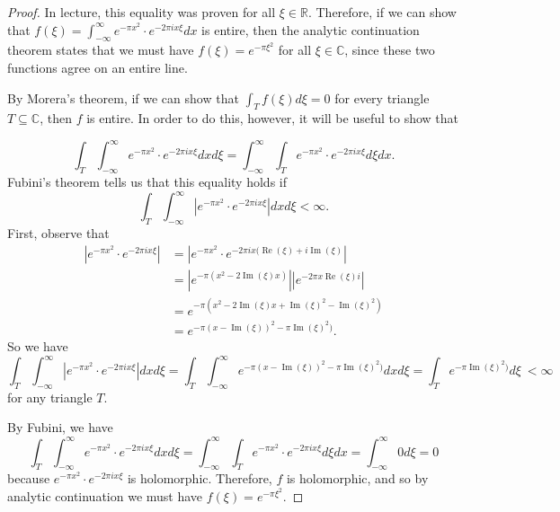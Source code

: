 \documentclass[10pt]{article}
\newcommand{\R}{\mathbb{R}}
\newcommand{\C}{\mathbb{C}}
\newcommand{\Int}{\displaystyle\int}
\DeclareMathOperator*{\re}{Re}
\DeclareMathOperator*{\im}{Im}
\begin{document}
\begin{enumerate}
\begin{proof}

In lecture, this equality was proven for all $\xi \in \R$.  Therefore, if we can show that $f(\xi) = \Int_{-\infty}^\infty e^{-\pi x^2} \cdot e^{-2\pi i x \xi} dx$ is entire, then the analytic continuation theorem states that we must have $f(\xi) = e^{- \pi \xi^2}$ for all $\xi \in \C$, since these two functions agree on an entire line.

By Morera's theorem, if we can show that $\Int_T f(\xi) d\xi = 0$ for every triangle $T \subseteq \C$, then $f$ is entire.  In order to do this, however, it will be useful to show that

$$
\Int_T \Int_{-\infty}^\infty e^{-\pi x^2} \cdot e^{-2\pi i x \xi} dx d\xi
=
\Int_{-\infty}^\infty \Int_T e^{-\pi x^2} \cdot e^{-2\pi i x \xi} d\xi dx.
$$
Fubini's theorem tells us that this equality holds if
$$
\Int_T \Int_{-\infty}^\infty |e^{-\pi x^2} \cdot e^{-2\pi i x \xi}| dx d\xi < \infty.
$$
First, observe that
\begin{align*}
|e^{-\pi x^2} \cdot e^{-2\pi i x \xi}|
&=
|e^{-\pi x^2} \cdot e^{-2\pi i x (\re(\xi) + i \im(\xi)}|
\\
&=| e^{-\pi(x^2 - 2\im(\xi)x)}||e^{-2\pi x \re(\xi) i}|
\\
&= e^{-\pi(x^2 - 2\im(\xi)x + \im(\xi)^2 - \im(\xi)^2)}
\\
&= e^{-\pi(x - \im(\xi))^2 - \pi\im(\xi)^2)}.
\end{align*}
So we have
$$
\Int_T \Int_{-\infty}^\infty |e^{-\pi x^2} \cdot e^{-2\pi i x \xi}| dx d\xi
=
\Int_T \Int_{-\infty}^\infty e^{-\pi(x - \im(\xi))^2 - \pi\im(\xi)^2)} dx d\xi
=
\Int_T e^{- \pi\im(\xi)^2)} d\xi\
< \infty
$$
for any triangle $T$.

By Fubini, we have
$$
\Int_T \Int_{-\infty}^\infty e^{-\pi x^2} \cdot e^{-2\pi i x \xi} dx d\xi
=
\Int_{-\infty}^\infty \Int_T e^{-\pi x^2} \cdot e^{-2\pi i x \xi} d\xi dx
=
\Int_{-\infty}^\infty 0 d\xi
=
0
$$
because $ e^{-\pi x^2} \cdot e^{-2\pi i x \xi}$ is holomorphic.  Therefore, $f$ is holomorphic, and so by analytic continuation we must have $f(\xi) = e^{- \pi \xi^2}$.
\end{proof}

\end{enumerate}
\end{document}
